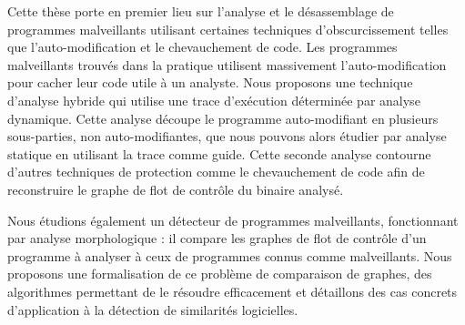Cette thèse porte en premier lieu sur l'analyse et le désassemblage de programmes malveillants utilisant certaines techniques d'obscurcissement telles que l'auto-modification et le chevauchement de code.
Les programmes malveillants trouvés dans la pratique utilisent massivement l'auto-modification pour cacher leur code utile à un analyste.
Nous proposons une technique d'analyse hybride qui utilise une trace d'exécution déterminée par analyse dynamique.
Cette analyse découpe le programme auto-modifiant en plusieurs sous-parties, non auto-modifiantes, que nous pouvons alors étudier par analyse statique en utilisant la trace comme guide.
Cette seconde analyse contourne d'autres techniques de protection comme le chevauchement de code afin de reconstruire le graphe de flot de contrôle du binaire analysé.

Nous étudions également un détecteur de programmes malveillants, fonctionnant par analyse morphologique : il compare les graphes de flot de contrôle d'un programme à analyser à ceux de programmes connus comme malveillants.
Nous proposons une formalisation de ce problème de comparaison de graphes, des algorithmes permettant de le résoudre efficacement et détaillons des cas concrets d'application à la détection de similarités logicielles.